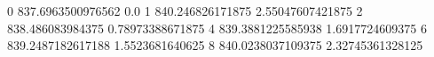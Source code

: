 0 837.6963500976562 0.0
1 840.246826171875 2.55047607421875
2 838.486083984375 0.78973388671875
4 839.3881225585938 1.6917724609375
6 839.2487182617188 1.5523681640625
8 840.0238037109375 2.32745361328125
